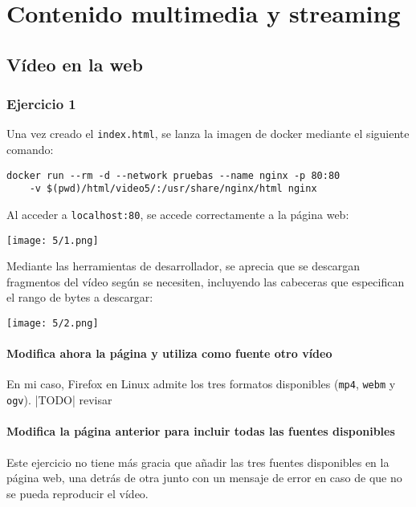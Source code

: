 \chapter{Contenido multimedia y streaming}\label{chap:5}
\section{Vídeo en la web}
\subsection{Ejercicio 1}
Una vez creado el \Verb#index.html#, se lanza la imagen de docker mediante el
siguiente comando:
\begin{verbatim}
docker run --rm -d --network pruebas --name nginx -p 80:80
    -v $(pwd)/html/video5/:/usr/share/nginx/html nginx
\end{verbatim}

Al acceder a \Verb#localhost:80#, se accede correctamente a la página web: \\
\begin{minipage}{\linewidth}
	\centering
	\texttt{[image: 5/1.png]}
	\label{fig:5/1}
\end{minipage}

Mediante las herramientas de desarrollador, se aprecia que se descargan fragmentos del vídeo
según se necesiten, incluyendo las cabeceras que especifican el rango de bytes a descargar: \\
\begin{minipage}{\linewidth}
	\centering
	\texttt{[image: 5/2.png]}
	\label{fig:5/2}
\end{minipage}

\subsubsection{Modifica ahora la página y utiliza como fuente otro vídeo}
En mi caso, Firefox en Linux admite los tres formatos disponibles (\Verb#mp4#, \Verb#webm# y \Verb#ogv#).
|TODO| revisar

\subsubsection{Modifica la página anterior para incluir todas las fuentes disponibles}
Este ejercicio no tiene más gracia que añadir las tres fuentes disponibles en la página web,
una detrás de otra junto con un mensaje de error en caso de que no se pueda reproducir el vídeo.

